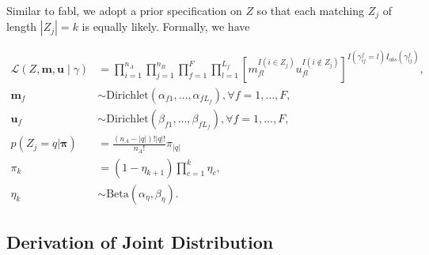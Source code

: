 \documentclass[12pt,letterpaper]{article}
\newcommand{\1}[1]{\mathbb{I}\!\left[#1\right]} %
\begin{document}
Similar to fabl, we adopt a prior specification on $Z$ so that each matching $Z_j$ of length $|Z_j| = k$ is equally likely. Formally, we have

\begin{subequations}
	\begin{align}
		\mathcal{L}(Z, \bm{m}, \bm{u} \mid \gamma) &= \prod_{i=1}^{n_A}  \prod_{j=1}^{n_B}\prod_{f=1}^{F}\prod_{l=1}^{L_f}\left[  m_{fl}^{I(i \in Z_j)}u_{fl}^{I(i \notin Z_j)}\right]^{I(\gamma_{ij}^f = l)I_{obs}(\gamma_{ij}^f)}, \label{eqn:likelihood}\\
		\bm{m}_f &\sim \text{Dirichlet}(\alpha_{f1}, \ldots, \alpha_{f L_f}), \forall f = 1, \ldots, F, \label{eqn:m} \\
		\bm{u}_f &\sim \text{Dirichlet}(\beta_{f1}, \ldots, \beta_{f L_f}),\forall f = 1, \ldots, F,  \label{eqn:u}\\
		p(Z_j = q| \bm{\pi}) &= \frac{(n_A - |q|)! |q|!}{n_A!} \pi_{|q|}
 \label{eqn:z}\\
		\pi_k &= (1 - \eta_{k+1}) \prod_{c=1}^{k} \eta_c,  \\
		\eta_k &\sim \text{Beta}(\alpha_{\eta}, \beta_{\eta})\label{eqn:pi}.
	\end{align}
\end{subequations}



\subsection{Derivation of Joint Distribution}\label{sec:joint-distribution}
\end{document}
